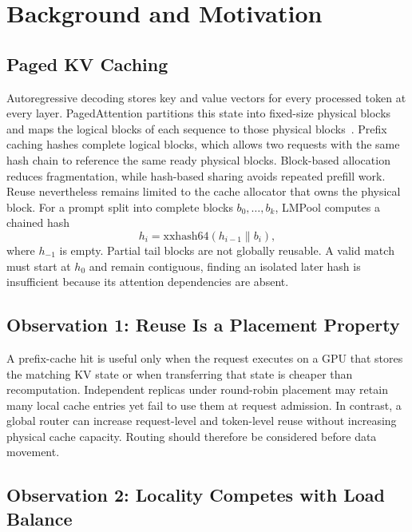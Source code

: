 \documentclass{article}
\newcommand{\sys}{LMPool}
\begin{document}
\section{Background and Motivation}
\label{sec:bg}

\subsection{Paged KV Caching}

Autoregressive decoding stores key and value vectors for every processed token at every layer. PagedAttention partitions this state into fixed-size physical blocks and maps the logical blocks of each sequence to those physical blocks~\citep{vLLM}. Prefix caching hashes complete logical blocks, which allows two requests with the same hash chain to reference the same ready physical blocks. Block-based allocation reduces fragmentation, while hash-based sharing avoids repeated prefill work. Reuse nevertheless remains limited to the cache allocator that owns the physical block. For a prompt split into complete blocks $b_0,\ldots,b_k$, \sys{} computes a chained hash
\begin{equation}
  h_i = \mathrm{xxhash64}(h_{i-1} \parallel b_i),
\end{equation}
where $h_{-1}$ is empty. Partial tail blocks are not globally reusable. A valid match must start at $h_0$ and remain contiguous, finding an isolated later hash is insufficient because its attention dependencies are absent.

\subsection{Observation 1: Reuse Is a Placement Property}

A prefix-cache hit is useful only when the request executes on a GPU that stores the matching KV state or when transferring that state is cheaper than recomputation. Independent replicas under round-robin placement may retain many local cache entries yet fail to use them at request admission. In contrast, a global router can increase request-level and token-level reuse without increasing physical cache capacity. Routing should therefore be considered before data movement.

\subsection{Observation 2: Locality Competes with Load Balance}
\end{document}
